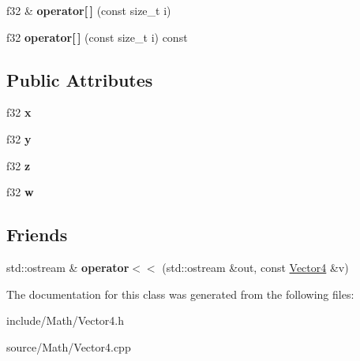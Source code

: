 \begin{DoxyCompactItemize}
\item 
f32 \& {\bfseries operator\mbox{[}$\,$\mbox{]}} (const size\+\_\+t i)\hypertarget{classDE_1_1Vector4_aa510fb0c425678484cae376d2d69de5c}{}\label{classDE_1_1Vector4_aa510fb0c425678484cae376d2d69de5c}

\item 
f32 {\bfseries operator\mbox{[}$\,$\mbox{]}} (const size\+\_\+t i) const \hypertarget{classDE_1_1Vector4_ac0dcf5e3d0fadc6f1636386661240efc}{}\label{classDE_1_1Vector4_ac0dcf5e3d0fadc6f1636386661240efc}

\end{DoxyCompactItemize}
\subsection*{Public Attributes}
\begin{DoxyCompactItemize}
\item 
f32 {\bfseries x}\hypertarget{classDE_1_1Vector4_a4ca58d9b1c49c1c6024b8e3d0801dc86}{}\label{classDE_1_1Vector4_a4ca58d9b1c49c1c6024b8e3d0801dc86}

\item 
f32 {\bfseries y}\hypertarget{classDE_1_1Vector4_a992dd9e27db8416a0d75db5062ef30f8}{}\label{classDE_1_1Vector4_a992dd9e27db8416a0d75db5062ef30f8}

\item 
f32 {\bfseries z}\hypertarget{classDE_1_1Vector4_a9729ca80f6a1f617b0a7b93a032cdb2e}{}\label{classDE_1_1Vector4_a9729ca80f6a1f617b0a7b93a032cdb2e}

\item 
f32 {\bfseries w}\hypertarget{classDE_1_1Vector4_ae6c6fe4a1dae5ff9b73ecfa1657ee08d}{}\label{classDE_1_1Vector4_ae6c6fe4a1dae5ff9b73ecfa1657ee08d}

\end{DoxyCompactItemize}
\subsection*{Friends}
\begin{DoxyCompactItemize}
\item 
std\+::ostream \& {\bfseries operator$<$$<$} (std\+::ostream \&out, const \hyperlink{classDE_1_1Vector4}{Vector4} \&v)\hypertarget{classDE_1_1Vector4_ad3d5a5ec411160580fac5b90bb0fa28c}{}\label{classDE_1_1Vector4_ad3d5a5ec411160580fac5b90bb0fa28c}

\end{DoxyCompactItemize}


The documentation for this class was generated from the following files\+:\begin{DoxyCompactItemize}
\item 
include/\+Math/Vector4.\+h\item 
source/\+Math/Vector4.\+cpp\end{DoxyCompactItemize}

